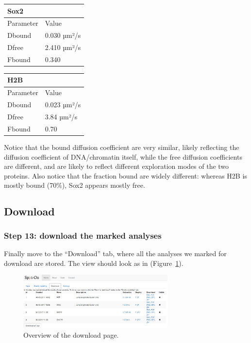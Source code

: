 \begin{center}
  \label{table:table9}
\begin{tabular}{ll}
Sox2 & \\
\hline
Parameter & Value\\
\hline
Dbound & 0.030 µm²/s\\
Dfree & 2.410 µm²/s\\
Fbound & 0.340\\
\end{tabular}
\end{center}

\begin{center}
  \label{table:table10}
\begin{tabular}{ll}
H2B & \\
\hline
Parameter & Value\\
\hline
Dbound & 0.023 µm²/s\\
Dfree & 3.84 µm²/s\\
Fbound & 0.70\\
\end{tabular}
\end{center}

Notice that the bound diffusion coefficient are very similar, likely reflecting the diffusion coefficient of DNA/chromatin itself, while the free diffusion coefficients are different, and are likely to reflect different exploration modes of the two proteins. Also notice that the fraction bound are widely different: whereas H2B is mostly bound (70\%), Sox2 appears mostly free.

\subsection{Download}
\subsubsection{Step 13: download the marked analyses}
Finally move to the ``Download'' tab, where all the analyses we marked for download are stored. The view should look as in (Figure~\ref{fig:tuto14}).

\begin{figure}[H]
\centering
\includegraphics[width=0.7\textwidth]{../SPTGUI/static/SPTGUI/img/tutorial/0.7/tuto14.png}
\caption{\label{fig:tuto14}Overview of the download page.}
\end{figure}

